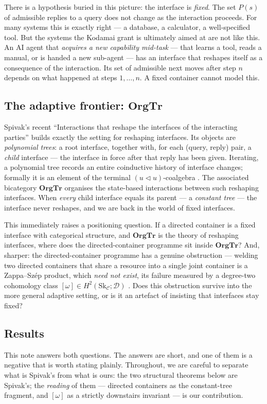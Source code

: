 \documentclass[11pt]{amsart}
\theoremstyle{definition}
\theoremstyle{remark}
\newcommand{\OrgTr}{\mathbf{OrgTr}}
\newcommand{\C}{\mathcal{C}}
\newcommand{\Sk}{\mathrm{Sk}}
\newcommand{\dir}{\mathcal{D}}
\newcommand{\seq}{\triangleleft}
\begin{document}
There is a hypothesis buried in this picture: the interface is \emph{fixed}. The set
$P(s)$ of admissible replies to a query does not change as the interaction proceeds. For
many systems this is exactly right --- a database, a calculator, a well-specified tool. But
the systems the Kodamai grant is ultimately aimed at are not like this. An AI agent that
\emph{acquires a new capability mid-task} --- that learns a tool, reads a manual, or is
handed a new sub-agent --- has an interface that reshapes itself as a consequence of the
interaction. Its set of admissible next moves after step $n$ depends on what happened at
steps $1,\dots,n$. A fixed container cannot model this.

\subsection*{The adaptive frontier: \texorpdfstring{$\OrgTr$}{OrgTr}}
Spivak's recent ``Interactions that reshape the interfaces of the interacting parties''
\cite{SpivakOrgTr} builds exactly the setting for reshaping interfaces. Its objects are
\emph{polynomial trees}: a root interface, together with, for each (query, reply) pair, a
\emph{child} interface --- the interface in force after that reply has been given. Iterating,
a polynomial tree records an entire coinductive history of interface changes; formally it
is an element of the terminal $(u\seq u)$-coalgebra \cite[Def.~3.1]{SpivakOrgTr}. The
associated bicategory $\OrgTr$ organises the state-based interactions between such
reshaping interfaces. When \emph{every} child interface equals its parent --- a
\emph{constant tree} --- the interface never reshapes, and we are back in the world of
fixed interfaces.

This immediately raises a positioning question. If a directed container is a fixed
interface with categorical structure, and $\OrgTr$ is the theory of reshaping interfaces,
where does the directed-container programme sit inside $\OrgTr$? And, sharper: the
directed-container programme has a genuine obstruction --- welding two directed containers
that share a resource into a single joint container is a Zappa--Szép product, which
\emph{need not exist}, its failure measured by a degree-two cohomology class
$[\omega]\in H^2(\Sk_\C;\dir)$ \cite{gobstr, analytic}. Does this obstruction survive into
the more general adaptive setting, or is it an artefact of insisting that interfaces stay
fixed?

\subsection*{Results}
This note answers both questions. The answers are short, and one of them is a negative
that is worth stating plainly. Throughout, we are careful to separate what is Spivak's
from what is ours: the two structural theorems below are Spivak's; the \emph{reading} of
them --- directed containers as the constant-tree fragment, and $[\omega]$ as a strictly
downstairs invariant --- is our contribution.
\end{document}
